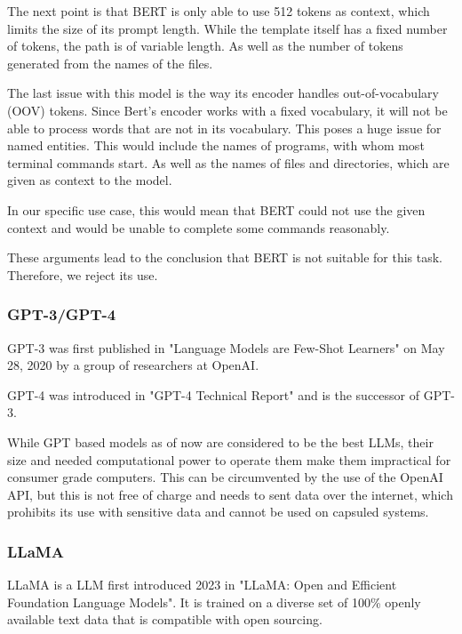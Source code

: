 The next point is that BERT is only able to use 512 tokens as context, which limits the size of its prompt length. While the template itself has a fixed number of tokens, the path is of variable length. As well as the number of tokens generated from the names of the files.



The last issue with this model is the way its encoder handles out-of-vocabulary (OOV) tokens. Since Bert's encoder works with a fixed vocabulary, it will not be able to process words that are not in its vocabulary. This poses a huge issue for named entities. This would include the names of programs, with whom most terminal commands start. As well as the names of files and directories, which are given as context to the model. 


In our specific use case, this would mean that BERT could not use the given context and would be unable to complete some commands reasonably. 


These arguments lead to the conclusion that BERT is not suitable for this task. Therefore, we reject its use.





\subsubsection{GPT-3/GPT-4}


GPT-3 was first published in "Language Models are Few-Shot Learners"\cite{brown2020language} on May 28, 2020 by a group of researchers at OpenAI.

GPT-4 was introduced in "GPT-4 Technical Report"\cite{openai2023gpt4} and is the successor of GPT-3.


While GPT based models as of now are considered to be the best LLMs, their size and needed computational power to operate them make them impractical for consumer grade computers. This can be circumvented by the use of the OpenAI API, but this is not free of charge and needs to sent data over the internet, which prohibits its use with sensitive data and cannot be used on capsuled systems. 


\subsubsection{LLaMA} 

LLaMA is a LLM first introduced 2023 in "LLaMA: Open and Efficient Foundation Language Models"\cite{touvron2023llama}. It is trained on a diverse set of  100\% openly available text data that is compatible with open sourcing\cite{touvron2023llama}.


